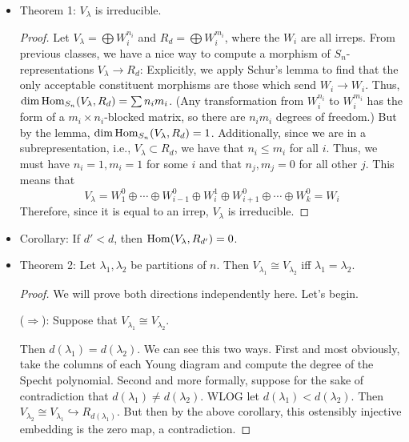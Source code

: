 \documentclass[../notes.tex]{subfiles}
\begin{document}
\begin{itemize}
\begin{proof}
        \begin{equation*}
            P(x_1,\dots,x_n) = u\cdot\Delta(x_1,\dots,x_{\lambda_1'})\Delta(x_{\lambda_1'+1},\dots,x_{\lambda_2'})\dots
        \end{equation*}
        from which it follows that $f=uI$. This implies the claim via the isomorphism $f\mapsto u$.
    \end{proof}
    \item Theorem 1: $V_\lambda$ is irreducible.
    \begin{proof}
        Let $V_\lambda=\bigoplus W_i^{n_i}$ and $R_d=\bigoplus W_i^{m_i}$, where the $W_i$ are all irreps. From previous classes, we have a nice way to compute a morphism of $S_n$-representations $V_\lambda\to R_d$: Explicitly, we apply Schur's lemma to find that the only acceptable constituent morphisms are those which send $W_i\to W_i$. Thus, $\dim\operatorname{Hom}_{S_n}(V_\lambda,R_d)=\sum n_im_i$. (Any transformation from $W_i^{n_i}$ to $W_i^{m_i}$ has the form of a $m_i\times n_i$-blocked matrix, so there are $n_im_i$ degrees of freedom.) But by the lemma, $\dim\operatorname{Hom}_{S_n}(V_\lambda,R_d)=1$. Additionally, since we are in a subrepresentation, i.e., $V_\lambda\subset R_d$, we have that $n_i\leq m_i$ for all $i$. Thus, we must have $n_i=1,m_i=1$ for some $i$ and that $n_j,m_j=0$ for all other $j$. This means that
        \begin{equation*}
            V_\lambda = W_1^0\oplus\cdots\oplus W_{i-1}^0\oplus W_i^1\oplus W_{i+1}^0\oplus\cdots\oplus W_k^0
            = W_i
        \end{equation*}
        Therefore, since it is equal to an irrep, $V_\lambda$ is irreducible.
    \end{proof}
    \item Corollary: If $d'<d$, then $\operatorname{Hom}(V_\lambda,R_{d'})=0$.
    \item Theorem 2: Let $\lambda_1,\lambda_2$ be partitions of $n$. Then $V_{\lambda_1}\cong V_{\lambda_2}$ iff $\lambda_1=\lambda_2$.
    \begin{proof}
        We will prove both directions independently here. Let's begin.\par\smallskip
        ($\Rightarrow$): Suppose that $V_{\lambda_1}\cong V_{\lambda_2}$.\par
        Then $d(\lambda_1)=d(\lambda_2)$. We can see this two ways. First and most obviously, take the columns of each Young diagram and compute the degree of the Specht polynomial. Second and more formally, suppose for the sake of contradiction that $d(\lambda_1)\neq d(\lambda_2)$. WLOG let $d(\lambda_1)<d(\lambda_2)$. Then $V_{\lambda_2}\cong V_{\lambda_1}\hookrightarrow R_{d(\lambda_1)}$. But then by the above corollary, this ostensibly injective embedding is the zero map, a contradiction.\par

\end{proof}
\end{itemize}
\end{document}
